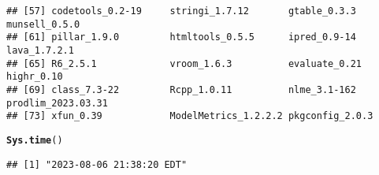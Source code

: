 \documentclass{article}\usepackage[]{graphicx}\usepackage[]{xcolor}
\makeatletter
\newcommand{\hlstd}[1]{\textcolor[rgb]{0.345,0.345,0.345}{#1}}%
\newcommand{\hlkwd}[1]{\textcolor[rgb]{0.737,0.353,0.396}{\textbf{#1}}}%
\newenvironment{kframe}{%
 \def\at@end@of@kframe{}%
 \ifinner\ifhmode%
  \def\at@end@of@kframe{\end{minipage}}%
  \begin{minipage}{\columnwidth}%
 \fi\fi%
 \def\FrameCommand##1{\hskip\@totalleftmargin \hskip-\fboxsep
 \colorbox{shadecolor}{##1}\hskip-\fboxsep
     \hskip-\linewidth \hskip-\@totalleftmargin \hskip\columnwidth}%
 \MakeFramed {\advance\hsize-\width
   \@totalleftmargin\z@ \linewidth\hsize
   \@setminipage}}%
 {\par\unskip\endMakeFramed%
 \at@end@of@kframe}
\newenvironment{knitrout}{}{} %
\makeatother
\begin{document}
\begin{knitrout}
\begin{kframe}
\begin{verbatim}
## [57] codetools_0.2-19     stringi_1.7.12       gtable_0.3.3         munsell_0.5.0       
## [61] pillar_1.9.0         htmltools_0.5.5      ipred_0.9-14         lava_1.7.2.1        
## [65] R6_2.5.1             vroom_1.6.3          evaluate_0.21        highr_0.10          
## [69] class_7.3-22         Rcpp_1.0.11          nlme_3.1-162         prodlim_2023.03.31  
## [73] xfun_0.39            ModelMetrics_1.2.2.2 pkgconfig_2.0.3
\end{verbatim}
\begin{alltt}
\hlkwd{Sys.time}\hlstd{()}
\end{alltt}
\begin{verbatim}
## [1] "2023-08-06 21:38:20 EDT"
\end{verbatim}
\end{kframe}
\end{knitrout}
\end{document}
